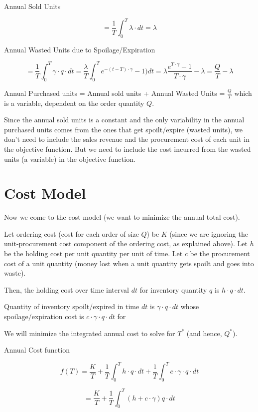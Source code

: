 \documentclass[11pt, oneside]{article}   	%
\begin{document}
Annual Sold Units

$$ = \frac {1} {T} \int_0^T \lambda \cdot dt = \lambda$$

Annual Wasted Units due to Spoilage/Expiration

$$ = \frac {1} {T} \int_0^T \gamma \cdot q \cdot dt = \frac {\lambda} {T} \int_0^T e^{-(t-T) \cdot \gamma} - 1) dt = \lambda \frac {e^{T \cdot \gamma} - 1} {T \cdot \gamma} - \lambda = \frac {Q} {T} - \lambda$$

Annual Purchased units = Annual sold units + Annual Wasted Units = $\frac {Q} {T}$ which is a variable, dependent on the order quantity $Q$.

Since the annual sold units is a constant and the only variability in the annual purchased units comes from the ones that get spoilt/expire (wasted units), we don't need to include the sales revenue and the procurement cost of each unit in the objective function. But we need to include the cost incurred from the wasted units (a variable) in the objective function.

\section{Cost Model}

Now we come to the cost model (we want to minimize the annual total cost).

Let ordering cost (cost for each order of size $Q$) be $K$ (since we are ignoring the unit-procurement cost component of the ordering cost, as explained above).
Let $h$ be the holding cost per unit quantity per unit of time. Let $c$ be the procurement cost of a unit quantity (money lost when a unit quantity gets spoilt and goes into waste).

Then, the holding cost over time interval $dt$ for inventory quantity $q$ is $h \cdot q \cdot dt$.

Quantity of inventory spoilt/expired  in time $dt$ is $\gamma \cdot q \cdot dt$ whose spoilage/expiration cost is $c \cdot \gamma \cdot q \cdot dt$ for 

We will minimize the integrated annual cost to solve for $T^*$ (and hence, $Q^*$).

Annual Cost function

$$ f(T) = \frac {K} {T} + \frac {1} {T} \int_0^T h \cdot q \cdot dt + \frac {1} {T} \int_0^T c \cdot \gamma \cdot q \cdot dt$$

$$ = \frac {K} {T} + \frac {1} {T} \int_0^T (h + c \cdot \gamma) q \cdot dt$$
\end{document}
